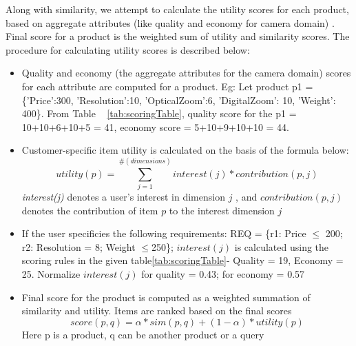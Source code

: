 \documentclass{llncs}
\begin{document}
Along with similarity, we attempt to calculate the utility scores for each product, based on aggregate attributes (like quality and economy for camera domain) . Final score for a product is the weighted sum of utility and similarity scores. The procedure for calculating utility scores is described below:
\begin{itemize}
\renewcommand{\labelitemi}{$\bullet$}
\item Quality and economy (the aggregate attributes for the camera domain) scores for each attribute are computed for a product. Eg: Let product p1 = \{'Price':300, 'Resolution':10, 'OpticalZoom':6, 'DigitalZoom': 10, 'Weight': 400\}. 
From Table ~ \ref{tab:scoringTable}, 
quality score for the p1 = 10+10+6+10+5 = 41, economy score = 5+10+9+10+10 = 44.
\item Customer-specific item utility is calculated on the basis of the formula below:
\begin{equation}
utility(p) = \sum_{j=1}^{\#(dimensions)} interest(j) * contribution(p, j)
\end{equation}
\textit{interest(j)} denotes a user's interest in dimension $j$ , and $contribution(p, j)$ denotes the contribution of item $p$ to the interest dimension $j$
\item If the user specificies the following requirements: REQ = \{r1: Price $\le$ 200; r2: Resolution = 8; Weight $\le$250\}; $interest(j)$ is calculated using the scoring rules in the given table\ref{tab:scoringTable}- Quality = 19, Economy = 25. Normalize $interest(j)$ for quality = 0.43; for economy = 0.57 

\item Final score for the product is computed as a weighted summation of similarity and utility. Items are ranked based on the final scores
\begin{equation}
\label{eq:alpha}
score(p, q) = \alpha*sim(p,q) + (1-\alpha)*utility(p)
\end{equation}
Here p is a product, q can be another product or a query

\end{itemize}
\end{document}
